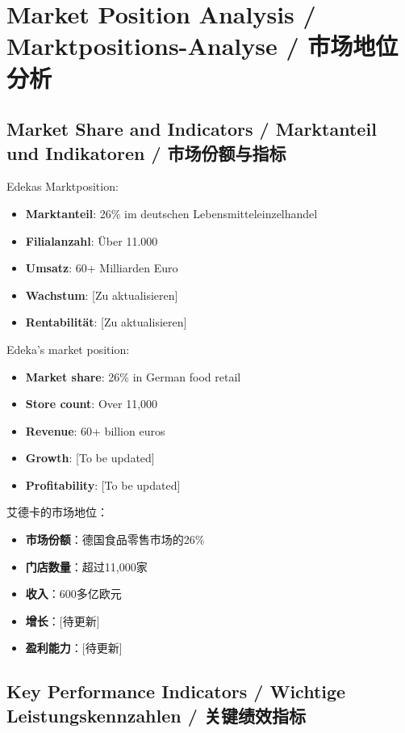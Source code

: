 \chapter{Market Position Analysis / Marktpositions-Analyse / 市场地位分析}

\section{Market Share and Indicators / Marktanteil und Indikatoren / 市场份额与指标}

\begin{otherlanguage}{ngerman}
Edekas Marktposition:
\begin{itemize}
    \item \textbf{Marktanteil}: 26\% im deutschen Lebensmitteleinzelhandel
    \item \textbf{Filialanzahl}: Über 11.000
    \item \textbf{Umsatz}: 60+ Milliarden Euro
    \item \textbf{Wachstum}: [Zu aktualisieren]
    \item \textbf{Rentabilität}: [Zu aktualisieren]
\end{itemize}
\end{otherlanguage}

Edeka's market position:
\begin{itemize}
    \item \textbf{Market share}: 26\% in German food retail
    \item \textbf{Store count}: Over 11,000
    \item \textbf{Revenue}: 60+ billion euros
    \item \textbf{Growth}: [To be updated]
    \item \textbf{Profitability}: [To be updated]
\end{itemize}

艾德卡的市场地位：
\begin{itemize}
    \item \textbf{市场份额}：德国食品零售市场的26\%
    \item \textbf{门店数量}：超过11,000家
    \item \textbf{收入}：600多亿欧元
    \item \textbf{增长}：[待更新]
    \item \textbf{盈利能力}：[待更新]
\end{itemize}

\section{Key Performance Indicators / Wichtige Leistungskennzahlen / 关键绩效指标}

